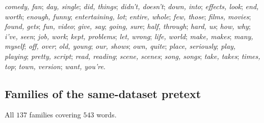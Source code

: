 \textit{comedy, fan};
\textit{day, single};
\textit{did, things};
\textit{didn't, doesn't};
\textit{down, into};
\textit{effects, look};
\textit{end, worth};
\textit{enough, funny};
\textit{entertaining, lot};
\textit{entire, whole};
\textit{few, those};
\textit{films, movies};
\textit{found, gets};
\textit{fun, video};
\textit{give, say};
\textit{going, sure};
\textit{half, through};
\textit{hard, us};
\textit{how, why};
\textit{i've, seen};
\textit{job, work};
\textit{kept, problems};
\textit{let, wrong};
\textit{life, world};
\textit{make, makes};
\textit{many, myself};
\textit{off, over};
\textit{old, young};
\textit{our, shows};
\textit{own, quite};
\textit{place, seriously};
\textit{play, playing};
\textit{pretty, script};
\textit{read, reading};
\textit{scene, scenes};
\textit{song, songs};
\textit{take, takes};
\textit{times, top};
\textit{town, version};
\textit{want, you're}.
\par\endgroup

\subsection{Families of the same-dataset pretext}

All $137$ families covering $543$ words.

